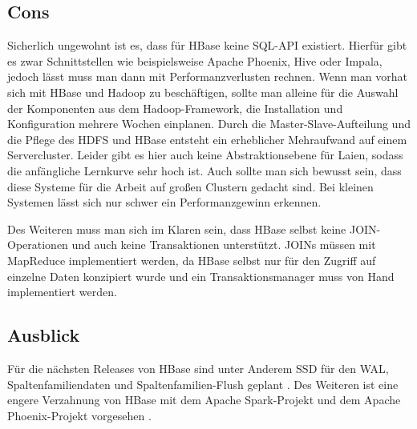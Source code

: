 \subsection{Cons}
Sicherlich ungewohnt ist es, dass für HBase keine SQL-API existiert. Hierfür gibt es zwar Schnittstellen wie beispielsweise Apache Phoenix, Hive oder Impala, jedoch lässt muss man dann mit Performanzverlusten rechnen. 
 Wenn man vorhat sich mit HBase und Hadoop zu beschäftigen, sollte man alleine für die Auswahl der Komponenten aus dem Hadoop-Framework, die Installation und Konfiguration mehrere Wochen einplanen. Durch die Master-Slave-Aufteilung und die Pflege des \ac{HDFS} und HBase entsteht ein erheblicher Mehraufwand auf einem Servercluster. Leider gibt es hier auch keine Abstraktionsebene für Laien, sodass die anfängliche Lernkurve sehr hoch ist. Auch sollte man sich bewusst sein, dass diese Systeme für die Arbeit auf großen Clustern gedacht sind. Bei kleinen Systemen lässt sich nur schwer ein Performanzgewinn erkennen.

Des Weiteren muss man sich im Klaren sein, dass HBase selbst keine JOIN-Operationen und auch keine Transaktionen unterstützt. JOINs müssen mit MapReduce implementiert werden, da HBase selbst nur für den Zugriff auf einzelne Daten konzipiert wurde und ein Transaktionsmanager muss von Hand implementiert werden.

\subsection{Ausblick}
Für die nächsten Releases von HBase sind unter Anderem SSD für den \ac{WAL}, Spaltenfamiliendaten und Spaltenfamilien-Flush geplant \cite{en15}. Des Weiteren ist eine engere Verzahnung von HBase mit dem Apache Spark-Projekt \cite{youspark} und dem Apache Phoenix-Projekt vorgesehen \cite{en16}.


